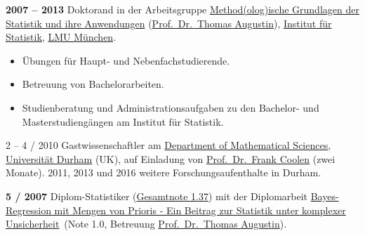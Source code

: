 \documentclass[a4paper]{simplecv}
\begin{document}
\begin{topic}
\item[\hspace*{-2ex}\bfseries 2007 -- 2013] Doktorand in der Arbeitsgruppe
                    \href{http://www.statistik.lmu.de/institut/ag/agmg/index.html}{\glqq Method(olog)ische Grundlagen der Statistik und ihre Anwendungen\grqq}
                    (\href{http://www.statistik.lmu.de/~thomas/}{Prof.\ Dr.\ Thomas Augustin}),
                    \href{http://www.statistik.lmu.de/index.html}{Institut für Statistik}, \href{http://www.lmu.de/}{LMU München}.
\begin{itemize}
\item Übungen für Haupt- und Nebenfachstudierende.
\item Betreuung von Bachelorarbeiten.
\item Studienberatung und Administrationsaufgaben zu den Bachelor- und Masterstudiengängen am Institut für Statistik.
\end{itemize}

\item[2 -- 4 / 2010] Gastwissenschaftler am \href{http://www.dur.ac.uk/mathematical.sciences/}{Department of Mathematical Sciences},
                 \href{http://www.durham.ac.uk}{Universität Durham} (UK),
                 auf Einladung von \href{http://maths.dur.ac.uk/stats/people/fc/fc.html}{Prof.\ Dr.\ Frank Coolen} (zwei Monate).
                 2011, 2013 und 2016 weitere Forschungsaufenthalte in Durham.



\item[\hspace*{-2ex}\bfseries 5 / 2007] Diplom-Statistiker (\href{http://www.geeeero.de/files/diplom.pdf}{Gesamtnote 1.37}) mit der Diplomarbeit
\href{http://www.geeeero/files/Diplomarbeit_GeroWalter.pdf}{\glqq Bayes-\-Re\-gres\-sion mit Mengen von Prioris - Ein Beitrag zur Statistik unter komplexer Unsicherheit\grqq}\
(Note 1.0, Betreuung \href{http://www.statistik.lmu.de/~thomas/}{Prof.\ Dr.\ Thomas Augustin}).


\end{topic}
\end{document}
